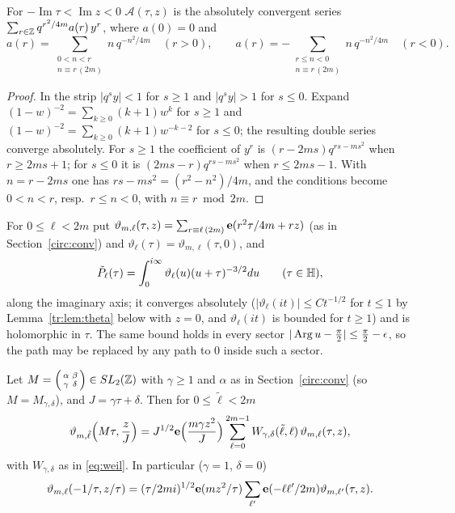 \begin{lemma}\label{tr:lem:Afourier}
For $-\operatorname{Im}\tau<\operatorname{Im}z<0$ $\mathcal A(\tau,z)$ is the absolutely convergent series $\sum_{r\in\mathbb{Z}}q^{r^2/4m}a(r)\,y^r$, where $a(0)=0$ and
\[
a(r)=\sum_{\substack{0<n<r\\ n\equiv r\,(2m)}}n\,q^{-n^2/4m}\quad(r>0),\qquad a(r)=-\sum_{\substack{r\le n<0\\ n\equiv r\,(2m)}}n\,q^{-n^2/4m}\quad(r<0).
\]
\end{lemma}

\begin{proof}
In the strip $|q^sy|<1$ for $s\ge1$ and $|q^sy|>1$ for $s\le0$. Expand $(1-w)^{-2}=\sum_{k\ge0}(k+1)w^k$ for $s\ge1$ and $(1-w)^{-2}=\sum_{k\ge0}(k+1)w^{-k-2}$ for $s\le0$; the resulting double series converge absolutely. For $s\ge1$ the coefficient of $y^r$ is $(r-2ms)q^{rs-ms^2}$ when $r\ge2ms+1$; for $s\le0$ it is $(2ms-r)q^{rs-ms^2}$ when $r\le2ms-1$. With $n=r-2ms$ one has $rs-ms^2=(r^2-n^2)/4m$, and the conditions become $0<n<r$, resp.\ $r\le n<0$, with $n\equiv r\bmod2m$.
\end{proof}

For $0\le\ell<2m$ put $\vartheta_{m,\ell}(\tau,z)=\sum_{r\equiv\ell\,(2m)}\mathbf e(r^2\tau/4m+rz)$ (as in Section~\ref{circ:conv}) and $\vartheta_\ell(\tau)=\vartheta_{m,\ell}(\tau,0)$, and
\[
\tilde P_\ell(\tau)=\int_0^{i\infty}\vartheta_\ell(u)(u+\tau)^{-3/2}du\qquad(\tau\in\mathbb{H}),
\]
along the imaginary axis; it converges absolutely ($|\vartheta_\ell(it)|\le Ct^{-1/2}$ for $t\le1$ by Lemma~\ref{tr:lem:theta} below with $z=0$, and $\vartheta_\ell(it)$ is bounded for $t\ge1$) and is holomorphic in $\tau$. The same bound holds in every sector $|\operatorname{Arg} u-\frac\pi2|\le\frac\pi2-\epsilon$, so the path may be replaced by any path to $0$ inside such a sector.

\begin{lemma}\label{tr:lem:theta}
Let $M=\begin{psmallmatrix}\alpha&\beta\\\gamma&\delta\end{psmallmatrix}\in SL_2(\mathbb{Z})$ with $\gamma\ge1$ and $\alpha$ as in Section~\ref{circ:conv} \textup(so $M=M_{\gamma,\delta}$\textup), and $J=\gamma\tau+\delta$. Then for $0\le\tilde\ell<2m$
\[
\vartheta_{m,\tilde\ell}\Big(M\tau,\frac zJ\Big)=J^{1/2}\mathbf e\Big(\frac{m\gamma z^2}J\Big)\sum_{\ell=0}^{2m-1}W_{\gamma,\delta}(\tilde\ell,\ell)\,\vartheta_{m,\ell}(\tau,z),
\]
with $W_{\gamma,\delta}$ as in \eqref{eq:weil}. In particular \textup($\gamma=1$, $\delta=0$\textup)
\[
\vartheta_{m,\ell}(-1/\tau,z/\tau)=(\tau/2mi)^{1/2}\mathbf e(mz^2/\tau)\sum_{\ell'}\mathbf e(-\ell\ell'/2m)\vartheta_{m,\ell'}(\tau,z).
\]
\end{lemma}

